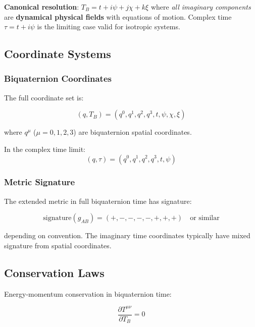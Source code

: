 \textbf{Canonical resolution}: $T_B = t + i\psi + j\chi + k\xi$ where \textit{all imaginary components} are \textbf{dynamical physical fields} with equations of motion. Complex time $\tau = t + i\psi$ is the limiting case valid for isotropic systems.

\subsection{Coordinate Systems}

\subsubsection{Biquaternion Coordinates}

The full coordinate set is:

\begin{equation}
\label{eq:canonical:full_coordinates}
(q, T_B) = (q^0, q^1, q^2, q^3, t, \psi, \chi, \xi)
\end{equation}

where $q^\mu$ ($\mu=0,1,2,3$) are biquaternion spatial coordinates.

In the complex time limit:
\begin{equation}
(q, \tau) = (q^0, q^1, q^2, q^3, t, \psi)
\end{equation}

\subsubsection{Metric Signature}

The extended metric in full biquaternion time has signature:

\begin{equation}
\label{eq:canonical:extended_signature}
\text{signature}(g_{AB}) = (+, -, -, -, -, +, +, +) \quad \text{or similar}
\end{equation}

depending on convention. The imaginary time coordinates typically have mixed signature from spatial coordinates.

\subsection{Conservation Laws}

Energy-momentum conservation in biquaternion time:

\begin{equation}
\label{eq:canonical:biq_conservation}
\frac{\partial T^{\mu\nu}}{\partial T_B} = 0
\end{equation}

